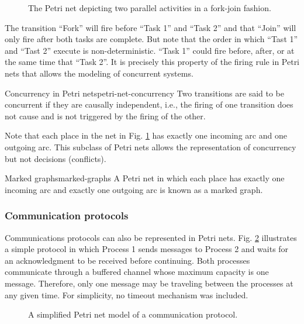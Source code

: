 \begin{figure}[!htb]
      \centering
      
      \caption{The Petri net depicting two parallel activities in a fork-join fashion.}
      \label{fig:parallel-activities-example}
\end{figure}

The transition ``Fork'' will fire before ``Task 1'' and ``Task 2''
and that ``Join'' will only fire after both tasks are complete.
But note that the order in which ``Tast 1'' and ``Tast 2'' execute is non-deterministic.
``Task 1'' could fire before, after, or at the same time that ``Task 2''.
It is precisely this property of the firing rule in Petri nets
that allows the modeling of concurrent systems.

\begin{definition}{Concurrency in Petri nets}{petri-net-concurrency}
      Two transitions are said to be concurrent if they are causally independent, i.e.,
      the firing of one transition does not cause and is not triggered by the firing of the other.
\end{definition}

Note that each place in the net in Fig. \ref{fig:parallel-activities-example}
has exactly one incoming arc and one outgoing arc.
This subclass of Petri nets allows the representation of concurrency but not decisions (conflicts).

\begin{definition}{Marked graphs}{marked-graphs}
      A Petri net in which each place has exactly one incoming arc
      and exactly one outgoing arc is known as a marked graph.
\end{definition}

\subsubsection{Communication protocols}

Communications protocols can also be represented in Petri nets.
Fig. \ref{fig:communication-protocols-example} illustrates a simple protocol
in which Process 1 sends messages to Process 2 and
waits for an acknowledgment to be received before continuing.
Both processes communicate through a buffered channel whose maximum capacity is one message.
Therefore, only one message may be traveling between the processes at any given time.
For simplicity, no timeout mechanism was included.

\begin{figure}[!htbp]
      \centering
      
      \caption{A simplified Petri net model of a communication protocol.}
      \label{fig:communication-protocols-example}
\end{figure}

